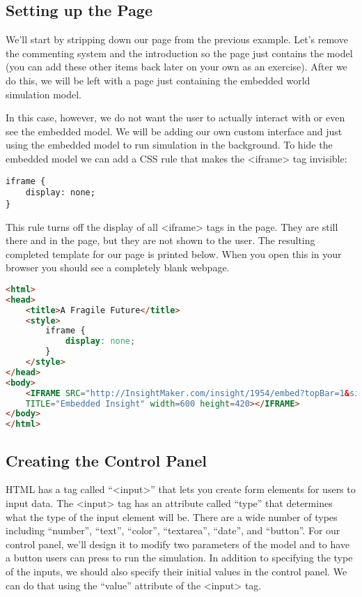 \documentclass[]{memoir}
\begin{document}
\subsection{Setting up the Page}

We'll start by stripping down our page from the previous example. Let's
remove the commenting system and the introduction so the page just
contains the model (you can add these other items back later on your own
as an exercise). After we do this, we will be left with a page just
containing the embedded world simulation model.

In this case, however, we do not want the user to actually interact with
or even see the embedded model. We will be adding our own custom
interface and just using the embedded model to run simulation in the
background. To hide the embedded model we can add a CSS rule that makes
the \textless{}iframe\textgreater{} tag invisible:

\begin{lstlisting}
iframe {
    display: none;
}
\end{lstlisting}

This rule turns off the display of all \textless{}iframe\textgreater{}
tags in the page. They are still there and in the page, but they are not
shown to the user. The resulting completed template for our page is
printed below. When you open this in your browser you should see a
completely blank webpage.

\begin{lstlisting}[language=HTML]
<html>
<head>
    <title>A Fragile Future</title>
    <style>
        iframe {
            display: none;
        }
    </style>
</head>
<body>
    <IFRAME SRC="http://InsightMaker.com/insight/1954/embed?topBar=1&sideBar=1&zoom=1"
    TITLE="Embedded Insight" width=600 height=420></IFRAME>  
</body>
</html>
\end{lstlisting}

\subsection{Creating the Control Panel}

HTML has a tag called ``\textless{}input\textgreater{}'' that lets you
create form elements for users to input data. The
\textless{}input\textgreater{} tag has an attribute called ``type'' that
determines what the type of the input element will be. There are a wide
number of types including ``number'', ``text'', ``color'', ``textarea'',
``date'', and ``button''. For our control panel, we'll design it to
modify two parameters of the model and to have a button users can press
to run the simulation. In addition to specifying the type of the inputs,
we should also specify their initial values in the control panel. We can
do that using the ``value'' attribute of the
\textless{}input\textgreater{} tag.
\end{document}
